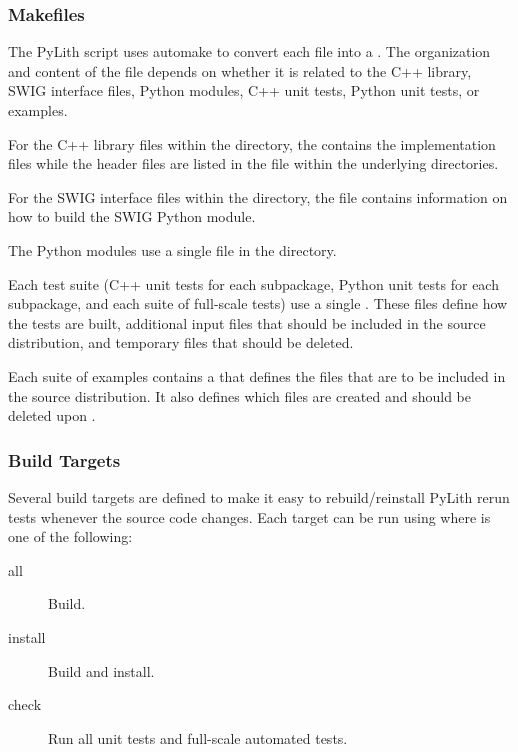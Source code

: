 \subsubsection{Makefiles}

The PyLith  script uses automake to convert each
 file into a . The
organization and content of the  file depends on
whether it is related to the C++ library, SWIG interface files, Python
modules, C++ unit tests, Python unit tests, or examples.

For the C++ library files within the  directory, the
 contains the implementation files while
the header files are listed in the  file within
the underlying directories.

For the SWIG interface files within the 
directory, the  file contains information on how
to build the SWIG Python module.

The Python modules use a single  file in
the  directory.

Each test suite (C++ unit tests for each subpackage, Python unit tests
for each subpackage, and each suite of full-scale tests) use a single
. These files define how the tests are built,
additional input files that should be included in the source
distribution, and temporary files that should be deleted.

Each suite of examples contains a  that defines
the files that are to be included in the source distribution. It also
defines which files are created and should be deleted upon
.

\subsubsection{Build Targets}

Several build targets are defined to make it easy to rebuild/reinstall
PyLith rerun tests whenever the source code changes. Each target can
be run using  where  is
one of the following:

\begin{description}
\item[all] Build.
\item[install] Build and install.
\item[check] Run all unit tests and full-scale automated tests.
\end{description}

